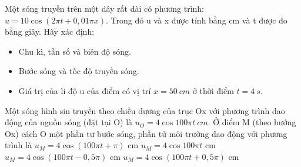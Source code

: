 \begin{vidu}%
Một sóng truyền trên một dây rất dài có phương trình: $u=10\cos(2\pi t+0,01\pi x)$. Trong đó u và x được tính bằng cm và t được đo bằng giây. Hãy xác định:
\begin{itemize}
\item[a)] Chu kì, tần số và biên độ sóng. 
\item[b)] Bước sóng và tốc độ truyền sóng.
\item[c)] Giá trị của li độ u của điểm có vị trí $x=50\ cm$ ở thời điểm $t=4\ s$. 
\end{itemize}
\end{vidu} 
\begin{vidu}%
Một sóng hình sin truyền theo chiều dương của trục Ox với phương trình dao động của nguồn sóng (đặt tại O) là $u_O = 4\cos100\pi t\ cm$. Ở điểm M (theo hướng Ox) cách O một phần tư bước sóng, phần tử môi trường dao động với phương trình là
\choice
{$u_M = 4\cos(100\pi t + \pi)$ cm}
{$u_M = 4\cos100\pi t$ cm}
{\True $u_M = 4\cos(100\pi t - 0,5\pi )$ cm}
{$u_M = 4\cos(100\pi t + 0,5\pi)$ cm}
\end{vidu} 
